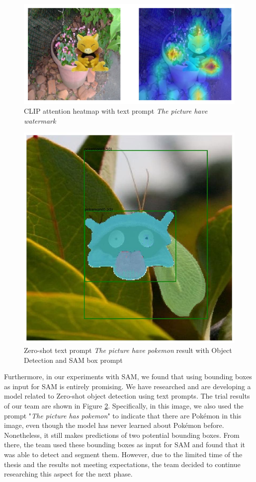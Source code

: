 \begin{figure}[t]
    \centering
    \includegraphics[width=0.75\linewidth]{img/pic_of_wtm.png}
    \caption{CLIP attention heatmap with text prompt \textit{The picture have watermark}}
    \label{fig:pic_of_wtm}
\end{figure}

\begin{figure}[t]
    \centering
    \includegraphics[width=0.75\linewidth]{img/groundedsam.png}
    \caption[Zero-shot text prompt result with Object Detection and SAM box prompt]{Zero-shot text prompt \textit{The picture have pokemon} result with Object Detection and SAM box prompt}
    \label{fig:groundedsam}
\end{figure}
Furthermore, in our experiments with SAM, we found that using bounding boxes as input for SAM is entirely promising. We have researched and are developing a model related to Zero-shot object detection using text prompts. The trial results of our team are shown in Figure \ref{fig:groundedsam}. Specifically, in this image, we also used the prompt "\textit{The picture has pokemon}" to indicate that there are Pokémon in this image, even though the model has never learned about Pokémon before. Nonetheless, it still makes predictions of two potential bounding boxes. From there, the team used these bounding boxes as input for SAM and found that it was able to detect and segment them. However, due to the limited time of the thesis and the results not meeting expectations, the team decided to continue researching this aspect for the next phase.
